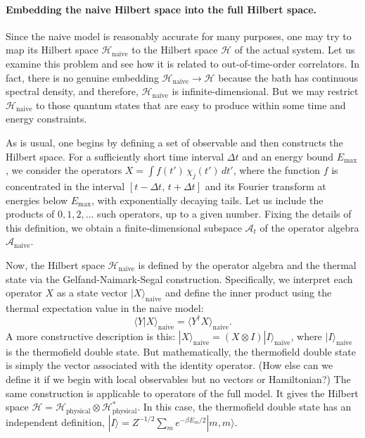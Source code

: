 \documentclass[12pt]{article}
\newcommand{\brangle}{\bigr\rangle}
\newcommand*{\kett}[1]{|{#1}\rangle}
\newcommand*{\brakett}[2]{\langle{#1}|{#2}\rangle}
\newcommand*{\bkett}[1]{\big|{#1}\brangle}
\newcommand*{\corr}[1]{\langle{#1}\rangle}
\renewcommand{\le}{\leqslant}
\newcommand{\calA}{\mathcal{A}}
\newcommand{\calH}{\mathcal{H}}
\newcommand{\naive}{\text{naive}}
\begin{document}
\paragraph{Embedding the naive Hilbert space into the full Hilbert space.}
Since the naive model is reasonably accurate for many purposes, one may try to map its Hilbert space $\calH_{\naive}$ to the Hilbert space $\calH$ of the actual system. Let us examine this problem and see how it is related to out-of-time-order correlators. In fact, there is no genuine embedding $\calH_{\naive}\to\calH$ because the bath has continuous spectral density, and therefore, $\calH_{\naive}$ is infinite-dimensional. But we may restrict $\calH_{\naive}$ to those quantum states that are easy to produce within some time and energy constraints.

As is usual, one begins by defining a set of observable and then constructs the Hilbert space. For a sufficiently short time interval $\Delta t$ and an energy bound $E_{\max}$, we consider the operators $X=\int f(t')\,\chi_j(t')\,dt'$, where the function $f$ is concentrated in the interval $[t-\Delta t,\,t+\Delta t]$ and its Fourier transform at energies below $E_{\max}$, with exponentially decaying tails.
Let us include the products of $0,1,2,\ldots$ such operators, up to a given number. Fixing the details of this definition, we obtain a finite-dimensional subspace $\calA_{t}$ of the operator algebra $\calA_\naive$.

Now, the Hilbert space $\calH_\naive$ is defined by the operator algebra and the thermal state via the Gelfand-Naimark-Segal construction. Specifically, we interpret each operator $X$ as a state vector $\kett{X}_\naive$ and define the inner product using the thermal expectation value in the naive model:
\begin{equation}
\brakett{Y}{X}_\naive=\corr{Y^{\dag}X}_\naive.
\end{equation}
A more constructive description is this: $\kett{X}_\naive=(X\otimes I)\kett{I}_\naive$, where $\kett{I}_\naive$ is the thermofield double state. But mathematically, the thermofield double state is simply the vector associated with the identity operator. (How else can we define it if we begin with local observables but no vectors or Hamiltonian?) The same construction is applicable to operators of the full model. It gives the Hilbert space $\calH=\calH_{\text{physical}}\otimes\calH_{\text{physical}}^{*}$. In this case, the thermofield double state has an independent definition, $\kett{I}=Z^{-1/2}\sum_{m}e^{-\beta E_m/2}\kett{m,m}$.
\end{document}
